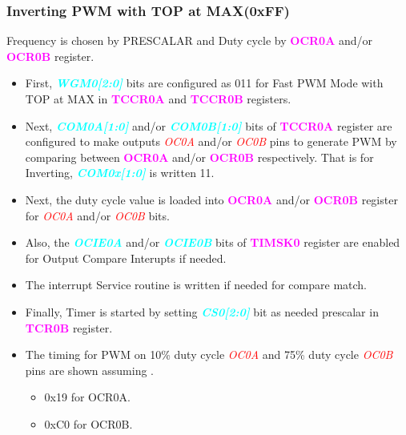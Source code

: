 \documentclass{article}
\newcommand{\bitFormat}[1]{\emph{\textbf{\textcolor{cyan}{#1}}}}
\newcommand{\regFormat}[1]{\textbf{\textcolor{magenta}{#1}}}
\newcommand{\pinFormat}[1]{\emph{\textcolor{red}{#1}}}
\begin{document}
\subsubsection{Inverting PWM with TOP at MAX(0xFF)}
\quad Frequency is chosen by PRESCALAR and Duty cycle by \regFormat{OCR0A} and/or \regFormat{OCR0B} register.
\begin{itemize}
    \item First, \bitFormat{WGM0[2:0]} bits are configured as 011 for Fast PWM Mode with TOP at MAX in \regFormat{TCCR0A} and \regFormat{TCCR0B} registers.
    \item Next, \bitFormat{COM0A[1:0]} and/or \bitFormat{COM0B[1:0]} bits of \regFormat{TCCR0A} register are configured to make outputs \pinFormat{OC0A} and/or \pinFormat{OC0B} pins to generate PWM by comparing between \regFormat{OCR0A} and/or \regFormat{OCR0B} respectively. That is for Inverting, \bitFormat{COM0x[1:0]} is written 11.
    \item Next, the duty cycle value is loaded into \regFormat{OCR0A} and/or \regFormat{OCR0B} register for \pinFormat{OC0A} and/or \pinFormat{OC0B} bits.
    \item Also, the \bitFormat{OCIE0A} and/or \bitFormat{OCIE0B} bits of \regFormat{TIMSK0} register  are enabled for Output Compare Interupts if needed.
    \item The interrupt Service routine is written if needed for compare match.
    \item Finally, Timer is started by setting \bitFormat{CS0[2:0]} bit as needed prescalar in \regFormat{TCR0B} register.
    \item The timing for PWM on 10\% duty cycle \pinFormat{OC0A} and 75\% duty cycle \pinFormat{OC0B} pins are shown assuming .
    \begin{itemize}
        \item 0x19 for OCR0A.
        \item 0xC0 for OCR0B.
    \end{itemize}
\end{itemize}
\end{document}
